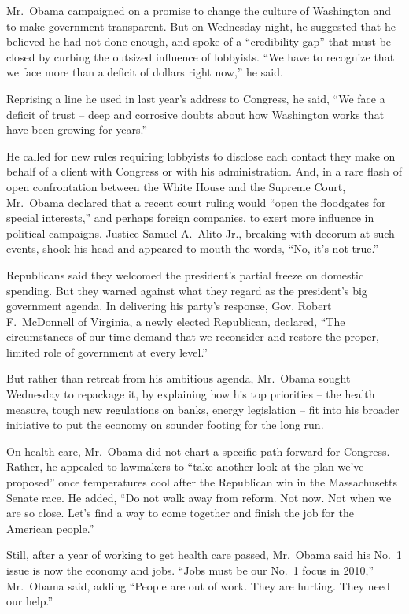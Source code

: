 ﻿\documentclass[12pt]{article}
\begin{document}
Mr.~Obama campaigned on a promise to change the culture of Washington and to make government
transparent. But on Wednesday night, he suggested that he believed he had not done enough, and spoke
of a ``credibility gap'' that must be closed by curbing the outsized influence of lobbyists. ``We
have to recognize that we face more than a deficit of dollars right now,'' he said.

Reprising a line he used in last year's address to Congress, he said, ``We face a deficit of trust
-- deep and corrosive doubts about how Washington works that have been growing for years.''

He called for new rules requiring lobbyists to disclose each contact they make on behalf of a client
with Congress or with his administration. And, in a rare flash of open confrontation between the
White House and the Supreme Court, Mr.~Obama declared that a recent court ruling would ``open the
floodgates for special interests,'' and perhaps foreign companies, to exert more influence in
political campaigns. Justice Samuel A.~Alito Jr., breaking with decorum at such events, shook his
head and appeared to mouth the words, ``No, it's not true.''

Republicans said they welcomed the president's partial freeze on domestic spending. But they warned
against what they regard as the president's big government agenda. In delivering his party's
response, Gov. Robert F.~McDonnell of Virginia, a newly elected Republican, declared, ``The
circumstances of our time demand that we reconsider and restore the proper, limited role of
government at every level.''

But rather than retreat from his ambitious agenda, Mr.~Obama sought Wednesday to repackage it, by
explaining how his top priorities -- the health measure, tough new regulations on banks, energy
legislation -- fit into his broader initiative to put the economy on sounder footing for the long
run.

On health care, Mr.~Obama did not chart a specific path forward for Congress. Rather, he appealed to
lawmakers to ``take another look at the plan we've proposed'' once temperatures cool after the
Republican win in the Massachusetts Senate race. He added, ``Do not walk away from reform. Not now.
Not when we are so close. Let's find a way to come together and finish the job for the American
people.''

Still, after a year of working to get health care passed, Mr.~Obama said his No.~1 issue is now the
economy and jobs. ``Jobs must be our No.~1 focus in 2010,'' Mr.~Obama said, adding ``People are out
of work. They are hurting. They need our help.''
\end{document}
